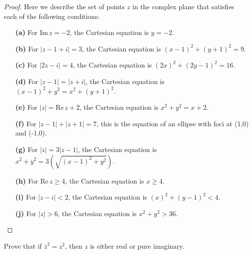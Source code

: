 \documentclass[
	12pt, %
	fleqn, %
	a4paper, %
]{LegrandOrangeBook}
\begin{document}
\begin{proof}
    Here we describe the set of points \( z \) in the complex plane that satisfies each of the following conditions:
    
    \begin{enumerate}
      \item[\textbf{(a)}] For \( \text{Im} \, z = -2 \), the Cartesian equation is \( y = -2 \).
      \item[\textbf{(b)}] For \( |z - 1 + i| = 3 \), the Cartesian equation is \( (x - 1)^2 + (y + 1)^2 = 9 \).
      \item[\textbf{(c)}] For \( |2z - i| = 4 \), the Cartesian equation is \( (2x)^2 + (2y - 1)^2 = 16 \).
      \item[\textbf{(d)}] For \( |z - 1| = |z + i| \), the Cartesian equation is \( (x - 1)^2 + y^2 = x^2 + (y + 1)^2 \).
      \item[\textbf{(e)}] For \( |z| = \text{Re} \, z + 2 \), the Cartesian equation is \( x^2 + y^2 = x + 2 \).
      \item[\textbf{(f)}] For \( |z - 1| + |z + 1| = 7 \), this is the equation of an ellipse with foci at (1,0) and (-1,0).
      \item[\textbf{(g)}] For \( |z| = 3|z - 1| \), the Cartesian equation is \( x^2 + y^2 = 3(\sqrt{(x - 1)^2 + y^2}) \).
      \item[\textbf{(h)}] For \( \text{Re} \, z \geq 4 \), the Cartesian equation is \( x \geq 4 \).
      \item[\textbf{(i)}] For \( |z - i| < 2 \), the Cartesian equation is \( (x)^2 + (y - 1)^2 < 4 \).
      \item[\textbf{(j)}] For \( |z| > 6 \), the Cartesian equation is \( x^2 + y^2 > 36 \).
    \end{enumerate}
    \end{proof}

    \begin{exercise}
        Prove that if \( \overline{z}^2 = z^2 \), then \( z \) is either real or pure imaginary.
        \end{exercise}
        
\end{document}
